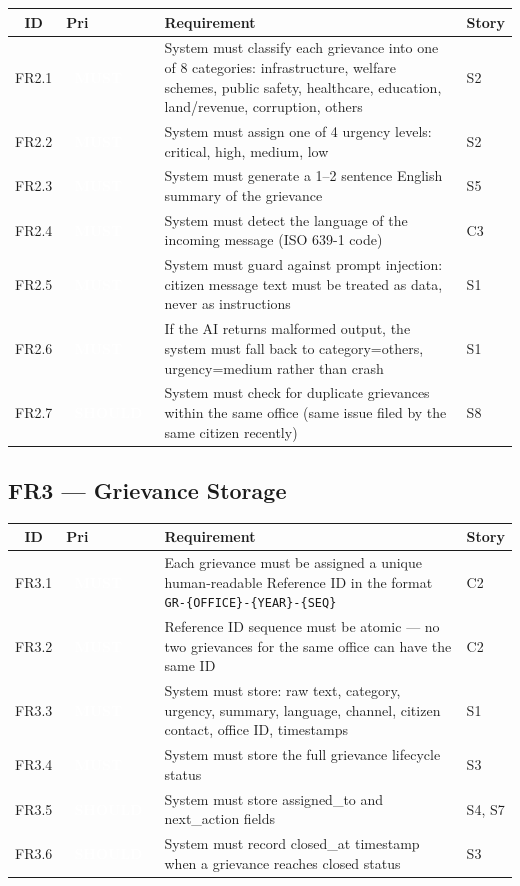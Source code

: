 \documentclass[11pt, a4paper]{article}
\newcommand{\must}{\textcolor{white}{\colorbox{mustcol}{\textbf{\ MUST\ }}}}
\newcommand{\should}{\textcolor{white}{\colorbox{shouldcol}{\textbf{\ SHOULD\ }}}}
\begin{document}
\begin{tabularx}{\linewidth}{clXl}
\toprule
\textbf{ID} & \textbf{Pri} & \textbf{Requirement} & \textbf{Story} \\
\midrule
FR2.1 & \must   & System must classify each grievance into one of 8 categories: infrastructure, welfare schemes, public safety, healthcare, education, land/revenue, corruption, others & S2 \\
FR2.2 & \must   & System must assign one of 4 urgency levels: critical, high, medium, low & S2 \\
FR2.3 & \must   & System must generate a 1--2 sentence English summary of the grievance & S5 \\
FR2.4 & \must   & System must detect the language of the incoming message (ISO 639-1 code) & C3 \\
FR2.5 & \must   & System must guard against prompt injection: citizen message text must be treated as data, never as instructions & S1 \\
FR2.6 & \must   & If the AI returns malformed output, the system must fall back to category=others, urgency=medium rather than crash & S1 \\
FR2.7 & \should & System must check for duplicate grievances within the same office (same issue filed by the same citizen recently) & S8 \\
\bottomrule
\end{tabularx}

\subsection{FR3 --- Grievance Storage}

\begin{tabularx}{\linewidth}{clXl}
\toprule
\textbf{ID} & \textbf{Pri} & \textbf{Requirement} & \textbf{Story} \\
\midrule
FR3.1 & \must   & Each grievance must be assigned a unique human-readable Reference ID in the format \texttt{GR-\{OFFICE\}-\{YEAR\}-\{SEQ\}} & C2 \\
FR3.2 & \must   & Reference ID sequence must be atomic --- no two grievances for the same office can have the same ID & C2 \\
FR3.3 & \must   & System must store: raw text, category, urgency, summary, language, channel, citizen contact, office ID, timestamps & S1 \\
FR3.4 & \must   & System must store the full grievance lifecycle status & S3 \\
FR3.5 & \should & System must store assigned\_to and next\_action fields & S4, S7 \\
FR3.6 & \should & System must record closed\_at timestamp when a grievance reaches closed status & S3 \\
\bottomrule
\end{tabularx}
\end{document}
